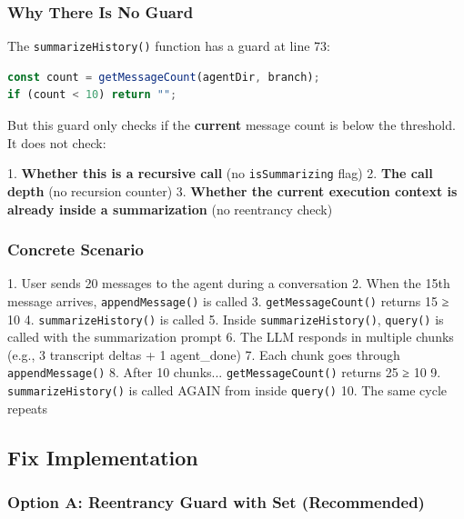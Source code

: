 \subsubsection*{Why There Is No Guard}

The \texttt{summarizeHistory()} function has a guard at line 73:



\begin{lstlisting}[language=TypeScript]
const count = getMessageCount(agentDir, branch);
if (count < 10) return "";

\end{lstlisting}



But this guard only checks if the \textbf{current} message count is below the threshold. It does not check:

1. \textbf{Whether this is a recursive call} (no \texttt{isSummarizing} flag)
2. \textbf{The call depth} (no recursion counter)
3. \textbf{Whether the current execution context is already inside a summarization} (no reentrancy check)

\subsubsection*{Concrete Scenario}

1. User sends 20 messages to the agent during a conversation
2. When the 15th message arrives, \texttt{appendMessage()} is called
3. \texttt{getMessageCount()} returns 15 ≥ 10
4. \texttt{summarizeHistory()} is called
5. Inside \texttt{summarizeHistory()}, \texttt{query()} is called with the summarization prompt
6. The LLM responds in multiple chunks (e.g., 3 transcript deltas + 1 agent\_done)
7. Each chunk goes through \texttt{appendMessage()}
8. After 10 chunks... \texttt{getMessageCount()} returns 25 ≥ 10
9. \texttt{summarizeHistory()} is called AGAIN from inside \texttt{query()}
10. The same cycle repeats


\subsection*{Fix Implementation}
\subsubsection*{Option A: Reentrancy Guard with Set (Recommended)}



